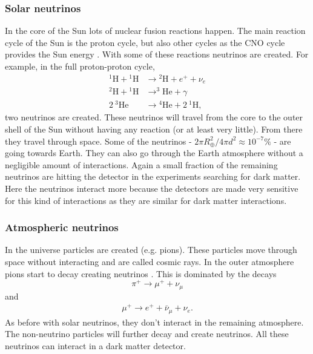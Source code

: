 \documentclass{article}
\begin{document}
\subsubsection{Solar neutrinos}
In the core of the Sun lots of nuclear fusion reactions happen. The main reaction cycle of the Sun is the proton cycle, but also other cycles as the CNO cycle provides the Sun energy \cite{Bonventre:2018hyd}. With some of these reactions neutrinos are created. For example, in the full proton-proton cycle,
\begin{align}
    {}^1\text{H}+{}^1\text{H}&\rightarrow {}^2\text{H}+e^++\nu_e \nonumber\\
    {}^2\text{H} + {}^1\text{H} &\rightarrow ^3\text{He}+\gamma \nonumber\\
    2\ {}^3\text{He} &\rightarrow {}^4\text{He}+2\ {}^1\text{H},
\end{align}
two neutrinos are created. These neutrinos will travel from the core to the outer shell of the Sun without having any reaction (or at least very little). From there they travel through space. Some of the neutrinos - $2\pi R_\oplus^2 / 4\pi d^2 \approx 10^{-7}\%$ - are going towards Earth. They can also go through the Earth atmosphere without a negligible amount of interactions. Again a small fraction of the remaining neutrinos are hitting the detector in the experiments searching for dark matter. Here the neutrinos interact more because the detectors are made very sensitive for this kind of interactions as they are similar for dark matter interactions.

\subsubsection{Atmospheric neutrinos}
In the universe particles are created (e.g. pions). These particles move through space without interacting and are called cosmic rays. In the outer atmosphere pions start to decay creating neutrinos \cite{Fukuda:1998mi,Gaisser:2016obt}. This is dominated by the decays
\begin{equation}
    \pi^+\rightarrow\mu^++\nu_\mu
\end{equation}
and
\begin{align}
    \mu^+\rightarrow e^++\bar{\nu}_\mu+\nu_e.
\end{align}
As before with solar neutrinos, they don't interact in the remaining atmosphere. The non-neutrino particles will further decay and create neutrinos. All these neutrinos can interact in a dark matter detector.
\end{document}
